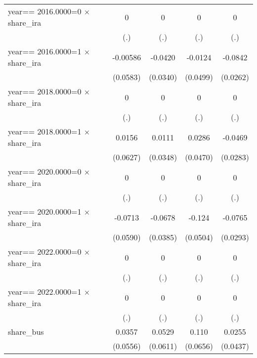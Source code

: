 \begin{table}[htbp]
\begin{tabular}{l*{4}{c}}
year==  2016.0000=0 $\times$ share\_ira&        0         &        0         &        0         &        0         \\
                &      (.)         &      (.)         &      (.)         &      (.)         \\
\addlinespace
year==  2016.0000=1 $\times$ share\_ira& -0.00586         &  -0.0420         &  -0.0124         &  -0.0842\sym{***}\\
                & (0.0583)         & (0.0340)         & (0.0499)         & (0.0262)         \\
\addlinespace
year==  2018.0000=0 $\times$ share\_ira&        0         &        0         &        0         &        0         \\
                &      (.)         &      (.)         &      (.)         &      (.)         \\
\addlinespace
year==  2018.0000=1 $\times$ share\_ira&   0.0156         &   0.0111         &   0.0286         &  -0.0469\sym{*}  \\
                & (0.0627)         & (0.0348)         & (0.0470)         & (0.0283)         \\
\addlinespace
year==  2020.0000=0 $\times$ share\_ira&        0         &        0         &        0         &        0         \\
                &      (.)         &      (.)         &      (.)         &      (.)         \\
\addlinespace
year==  2020.0000=1 $\times$ share\_ira&  -0.0713         &  -0.0678\sym{*}  &   -0.124\sym{**} &  -0.0765\sym{***}\\
                & (0.0590)         & (0.0385)         & (0.0504)         & (0.0293)         \\
\addlinespace
year==  2022.0000=0 $\times$ share\_ira&        0         &        0         &        0         &        0         \\
                &      (.)         &      (.)         &      (.)         &      (.)         \\
\addlinespace
year==  2022.0000=1 $\times$ share\_ira&        0         &        0         &        0         &        0         \\
                &      (.)         &      (.)         &      (.)         &      (.)         \\
\addlinespace
share\_bus       &   0.0357         &   0.0529         &    0.110\sym{*}  &   0.0255         \\
                & (0.0556)         & (0.0611)         & (0.0656)         & (0.0437)         \\

\end{tabular}
\end{table}
